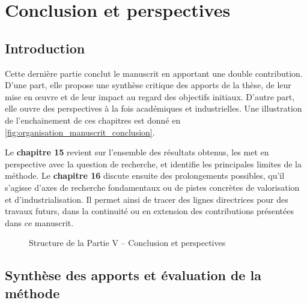 \clearpage
\thispagestyle{empty}
\null
\newpage

\cleardoublepage
{}
\part{Conclusion et perspectives}
\label{part:conclusion}

\clearpage
\thispagestyle{empty}
\null
\newpage

\chapter*{Introduction}

Cette dernière partie conclut le manuscrit en apportant une double contribution. D’une part, elle propose une synthèse critique des apports de la thèse, de leur mise en œuvre et de leur impact au regard des objectifs initiaux. D’autre part, elle ouvre des perspectives à la fois académiques et industrielles. Une illustration de l'enchainement de ces chapitres est donné en \autoref{fig:organisation_manuscrit_conclusion}.

Le \textbf{chapitre 15} revient sur l'ensemble des résultats obtenus, les met en perspective avec la question de recherche, et identifie les principales limites de la méthode. Le \textbf{chapitre 16} discute ensuite des prolongements possibles, qu’il s’agisse d’axes de recherche fondamentaux ou de pistes concrètes de valorisation et d’industrialisation. Il permet ainsi de tracer des lignes directrices pour des travaux futurs, dans la continuité ou en extension des contributions présentées dans ce manuscrit.

\begin{figure}[h!]
    \centering
    \resizebox{\linewidth}{!}{%
        
    }
    \caption{Structure de la Partie V -- Conclusion et perspectives}
    \label{fig:organisation_manuscrit_conclusion}
\end{figure}

\clearpage
\thispagestyle{empty}
\null
\newpage

\chapter{Synthèse des apports et évaluation de la méthode}
\label{chap:synthese_evaluation}

